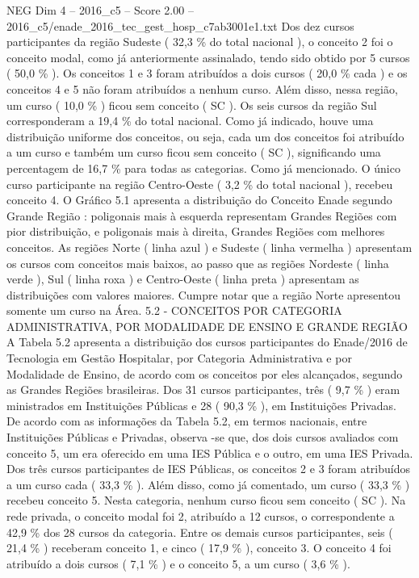 \begin{textsample}{NEG Dim 4 – 2016\_c5 – Score 2.00 – 2016\_c5/enade\_2016\_tec\_gest\_hosp\_c7ab3001e1.txt}
Dos dez cursos participantes da região Sudeste ( 32,3 \% do total nacional ), o conceito 2 foi o conceito modal, como já anteriormente assinalado, tendo sido obtido por 5 cursos ( 50,0 \% ).
Os conceitos 1 e 3 foram atribuídos a dois cursos ( 20,0 \% cada ) e os conceitos 4 e 5 não foram atribuídos a nenhum curso.
Além disso, nessa região, um curso ( 10,0 \% ) ficou sem conceito ( SC ).
Os seis cursos da região Sul corresponderam a 19,4 \% do total nacional.
Como já indicado, houve uma distribuição uniforme dos conceitos, ou seja, cada um dos conceitos foi atribuído a um curso e também um curso ficou sem conceito ( SC ), significando uma percentagem de 16,7 \% para todas as categorias.
Como já mencionado.
O único curso participante na região Centro-Oeste ( 3,2 \% do total nacional ), recebeu conceito 4.
O Gráfico 5.1 apresenta a distribuição do Conceito Enade segundo Grande Região : poligonais mais à esquerda representam Grandes Regiões com pior distribuição, e poligonais mais à direita, Grandes Regiões com melhores conceitos.
As regiões Norte ( linha azul ) e Sudeste ( linha vermelha ) apresentam os cursos com conceitos mais baixos, ao passo que as regiões Nordeste ( linha verde ), Sul ( linha roxa ) e Centro-Oeste ( linha preta ) apresentam as distribuições com valores maiores.
Cumpre notar que a região Norte apresentou somente um curso na Área. 5.2 - CONCEITOS POR CATEGORIA ADMINISTRATIVA, POR MODALIDADE DE ENSINO E GRANDE REGIÃO A Tabela 5.2 apresenta a distribuição dos cursos participantes do Enade/2016 de Tecnologia em Gestão Hospitalar, por Categoria Administrativa e por Modalidade de Ensino, de acordo com os conceitos por eles alcançados, segundo as Grandes Regiões brasileiras.
Dos 31 cursos participantes, três ( 9,7 \% ) eram ministrados em Instituições Públicas e 28 ( 90,3 \% ), em Instituições Privadas.
De acordo com as informações da Tabela 5.2, em termos nacionais, entre Instituições Públicas e Privadas, observa -se que, dos dois cursos avaliados com conceito 5, um era oferecido em uma IES Pública e o outro, em uma IES Privada.
Dos três cursos participantes de IES Públicas, os conceitos 2 e 3 foram atribuídos a um curso cada ( 33,3 \% ).
Além disso, como já comentado, um curso ( 33,3 \% ) recebeu conceito 5.
Nesta categoria, nenhum curso ficou sem conceito ( SC ).
Na rede privada, o conceito modal foi 2, atribuído a 12 cursos, o correspondente a 42,9 \% dos 28 cursos da categoria.
Entre os demais cursos participantes, seis ( 21,4 \% ) receberam conceito 1, e cinco ( 17,9 \% ), conceito 3.
O conceito 4 foi atribuído a dois cursos ( 7,1 \% ) e o conceito 5, a um curso ( 3,6 \% ).

\end{textsample}
